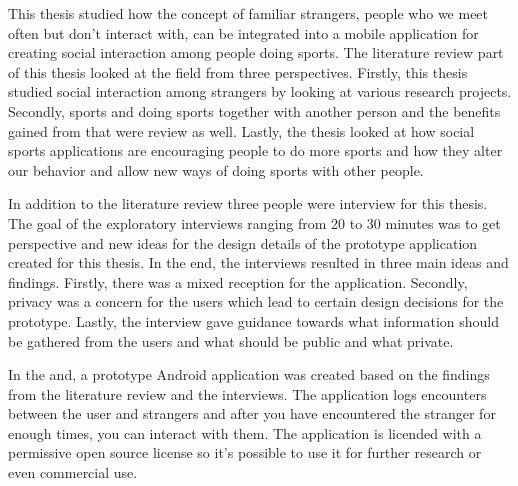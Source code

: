 %
%

\begin{enabstract}

This thesis studied how the concept of familiar strangers, people who we meet often but don't interact with, can be integrated into a mobile application for creating social interaction among people doing sports. The literature review part of this thesis looked at the field from three perspectives. Firstly, this thesis studied social interaction among strangers by looking at various research projects. Secondly, sports and doing sports together with another person and the benefits gained from that were review as well. Lastly, the thesis looked at how social sports applications are encouraging people to do more sports and how they alter our behavior and allow new ways of doing sports with other people.

In addition to the literature review three people were interview for this thesis. The goal of the exploratory interviews ranging from 20 to 30 minutes was to get perspective and new ideas for the design details of the prototype application created for this thesis. In the end, the interviews resulted in three main ideas and findings. Firstly, there was a mixed reception for the application. Secondly, privacy was a concern for the users which lead to certain design decisions for the prototype. Lastly, the interview gave guidance towards what information should be gathered from the users and what should be public and what private.

In the and, a prototype Android application was created based on the findings from the literature review and the interviews. The application logs encounters between the user and strangers and after you have encountered the stranger for enough times, you can interact with them. The application is licended with a permissive open source license so it's possible to use it for further research or even commercial use.

\end{enabstract}


